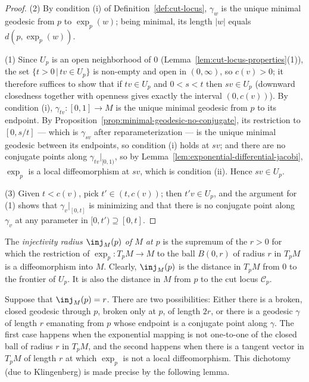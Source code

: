 \begin{proof}
(2) By condition (i) of Definition~\ref{def:cut-locus}, $\gamma_w$
is the unique minimal geodesic from $p$ to $\exp_p(w)$; being
minimal, its length $|w|$ equals $d(p,\exp_p(w))$.

(1) Since $U_p$ is an open neighborhood of $0$
(Lemma~\ref{lem:cut-locus-properties}(1)), the set
$\{t>0\,|\,tv\in U_p\}$ is non-empty and open in $(0,\infty)$, so
$c(v)>0$; it therefore suffices to
show that if $tv\in U_p$ and $0<s<t$ then $sv\in U_p$ (downward
closedness together with openness gives exactly the interval
$(0,c(v))$). By
condition (i), $\gamma_{tv}\colon[0,1]\to M$ is the unique minimal
geodesic from $p$ to its endpoint. By
Proposition~\ref{prop:minimal-geodesic-no-conjugate}, its
restriction to $[0,s/t]$ --- which is $\gamma_{sv}$ after
reparameterization --- is the unique minimal geodesic between its
endpoints, so condition (i) holds at $sv$; and there are no
conjugate points along $\gamma_{tv}|_{[0,1)}$, so by
Lemma~\ref{lem:exponential-differential-jacobi},
$\exp_p$ is a local diffeomorphism at $sv$, which is
condition (ii). Hence $sv\in U_p$.

(3) Given $t<c(v)$, pick $t'\in(t,c(v))$; then $t'v\in U_p$, and
the argument for (1) shows that $\gamma_v|_{[0,t]}$ is minimizing
and that there is no conjugate point along $\gamma_v$ at any
parameter in $[0,t')\supseteq[0,t]$.
\end{proof}




\begin{definition}
\label{def:injectivity-radius}
The {\sl injectivity radius $\inj_M(p)$ of $M$ at $p$} is the
supremum of the $r> 0$ for which the restriction of $\exp_p\colon T_pM\to M$ to the ball $B(0,r)$ of radius $r$ in $T_pM$
is a diffeomorphism into $M$. Clearly, $\inj_M(p)$ is the
distance in $T_pM$ from $0$ to the frontier of $U_p$. It is also the
distance in $M$ from $p$ to the cut locus ${\mathcal C}_p$.
\end{definition}

Suppose that  $\inj_M(p)=r$. There are two possibilities:
Either there is a broken, closed geodesic through $p$, broken only
at $p$, of length $2r$, or there is a geodesic $\gamma$ of length
$r$ emanating from $p$ whose endpoint is a conjugate point along
$\gamma$. The first case happens when the exponential mapping is not
one-to-one of the closed ball of radius $r$ in $T_pM$, and the
second happens when there is a tangent vector in $T_pM$ of length
$r$ at which $\exp_p$ is not a local diffeomorphism.
This dichotomy (due to Klingenberg) is made precise by the
following lemma.


